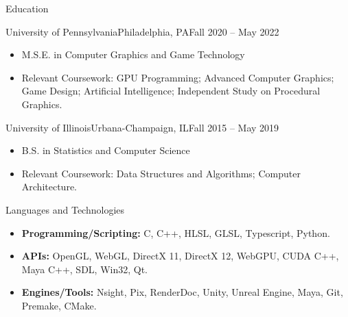 \documentclass[]{mcdowellcv}
\begin{document}
	\makeheader
	

	\begin{cvsection}{Education}
		\begin{cvsubsection}{University of Pennsylvania}{Philadelphia, PA}{Fall 2020 -- May 2022}
			\begin{itemize}
				\item M.S.E. in Computer Graphics and Game Technology
				\item Relevant Coursework: GPU Programming; Advanced Computer Graphics; Game Design; Artificial Intelligence; Independent Study on Procedural Graphics. 
			\end{itemize}
		\end{cvsubsection}
		\begin{cvsubsection}{University of Illinois}{Urbana-Champaign, IL}{Fall 2015 -- May 2019}
			\begin{itemize}
				\item B.S. in Statistics and Computer Science
				\item Relevant Coursework: Data Structures and Algorithms; Computer Architecture.
			\end{itemize}
		\end{cvsubsection}
	\end{cvsection}

	\begin{cvsection}{Languages and Technologies}
		\begin{cvsubsection}{}{}{}	
			\begin{itemize}
				\item \textbf{Programming/Scripting:} C, C++, HLSL, GLSL, Typescript, Python.
				\item \textbf{APIs:} OpenGL, WebGL, DirectX 11, DirectX 12, WebGPU, CUDA C++, Maya C++, SDL, Win32, Qt. 
				\item \textbf{Engines/Tools:} Nsight, Pix, RenderDoc, Unity, Unreal Engine, Maya, Git, Premake, CMake.
			\end{itemize}
		\end{cvsubsection}
	\end{cvsection}
	
\end{document}

